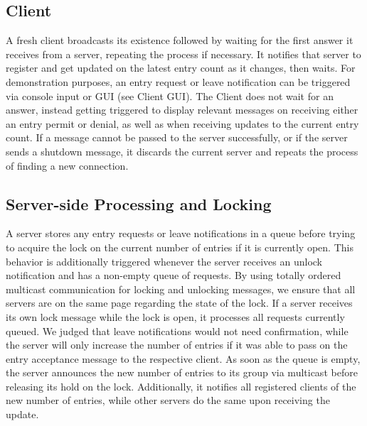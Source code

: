 \documentclass[runningheads]{llncs}
\begin{document}
\subsection{Client}
A fresh client broadcasts its existence followed by waiting for the first answer it receives from a server, repeating the process if necessary.
It notifies that server to register and get updated on the latest entry count as it changes, then waits.
For demonstration purposes, an entry request or leave notification can be triggered via console input or GUI (see Client GUI).
The Client does not wait for an answer, instead getting triggered to display relevant messages on receiving either an entry permit or denial, as well as when receiving updates to the current entry count.
If a message cannot be passed to the server successfully, or if the server sends a shutdown message, it discards the current server and repeats the process of finding a new connection.

\subsection{Server-side Processing and Locking}
A server stores any entry requests or leave notifications in a queue before trying to acquire the lock on the current number of entries if it is currently open.
This behavior is additionally triggered whenever the server receives an unlock notification and has a non-empty queue of requests.
By using totally ordered multicast communication for locking and unlocking messages, we ensure that all servers are on the same page regarding the state of the lock.
If a server receives its own lock message while the lock is open, it processes all requests currently queued.
We judged that leave notifications would not need confirmation, while the server will only increase the number of entries if it was able to pass on the entry acceptance message to the respective client.
As soon as the queue is empty, the server announces the new number of entries to its group via multicast before releasing its hold on the lock.
Additionally, it notifies all registered clients of the new number of entries, while other servers do the same upon receiving the update.
\end{document}
